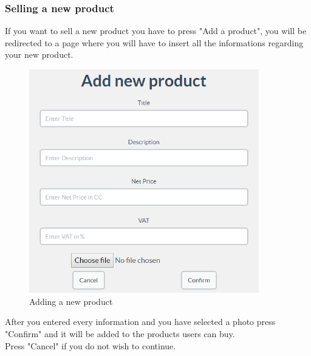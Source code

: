 	\subsubsection{Selling a new product}
	If you want to sell a new product you have to press "Add a product", you 
	will be redirected to a page where you will have to insert all the 
	informations regarding your new product.
	\begin{figure}[H]
		\includegraphics[width=10cm]{res/images/add_new_product.png}
		\centering
		\caption{Adding a new product}
	\end{figure}
	\noindent After you entered every information and you have selected a photo press
	"Confirm" and it will be added to the products users can buy.
	\\Press "Cancel" if you do not wish to continue.
	
